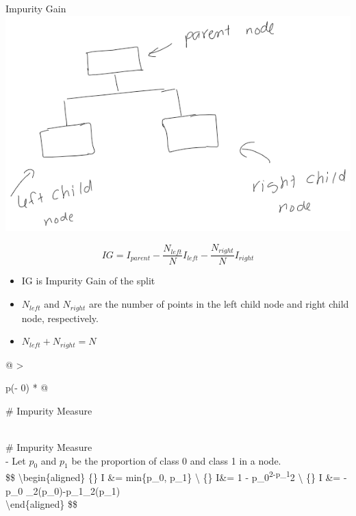 \documentclass[
  ignorenonframetext,
]{beamer}
\providecommand{\tightlist}{%
  \setlength{\itemsep}{0pt}\setlength{\parskip}{0pt}}
\begin{document}
\begin{frame}{Impurity Gain}
\protect\hypertarget{impurity-gain}{}
\includegraphics{images/parent_child.png}

\[
IG = I_{parent} - \frac{N_{left}}{N}I_{left}-\frac{N_{right}}{N}I_{right}
\]

\begin{itemize}
\tightlist
\item
  IG is Impurity Gain of the split
\item
  \(N_{left}\) and \(N_{right}\) are the number of points in the left
  child node and right child node, respectively.
\item
  \(N_{left}+N_{right}=N\)
\end{itemize}

\begin{longtable}[]{@{}
  >{\raggedright\arraybackslash}p{(\columnwidth - 0\tabcolsep) * }@{}}
\toprule
\begin{minipage}[b]{\linewidth}\raggedright
\# Impurity Measure
\end{minipage} \\
\midrule
\endhead
\# Impurity Measure \\
- Let \(p_0\) and \(p_1\) be the proportion of class 0 and class 1 in a
node. \\
\$\$ \textbackslash begin\{aligned\}
\{\} I \&= min\{p\_0, p\_1\}
\textbackslash{} \{\} I\&= 1 -
p\_0\textsuperscript{2-p\_1}2 \textbackslash{} \{\} I
\&= -p\_0 \log\_2(p\_0)-p\_1\log\_2(p\_1) \\
\textbackslash end\{aligned\} \$\$ \\
\bottomrule
\end{longtable}
\end{frame}
\end{document}
